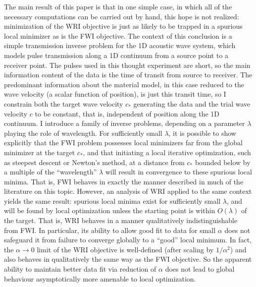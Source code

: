 The main result of this paper is that in one simple case, in which all
of the necessary computations can be carried out by hand, this hope is
not realized: minimization of the WRI objective is just as likely to
be trapped in a spurious local minimizer as is the FWI objective.  The
context of this conclusion is a simple transmission inverse problem
for the 1D acoustic wave system, which models pulse transmission along
a 1D continuum from a source point to a receiver point. The pulses
used in this thought experiment are short, so the main information
content of the data is the time of transit from source to
receiver. The predominant information about the material model, in
this case reduced to the wave velocity (a scalar function of
position), is just this transit time, so I constrain both the target
wave velocity $c_*$ generating the data and the trial wave velocity
$c$ to be constant, that is, independent of position along the 1D
continuum. I introduce a family of inverse problems, depending on a
parameter $\lambda$ playing the role of wavelength. For sufficiently small
$\lambda$, it is possible to show explicitly that the FWI problem
possesses local minimizers far from the global minimizer at the target
$c_*$, and that initiating a local iterative optimization, such as
steepest descent or Newton's method, at a distance from $c_*$ bounded
below by a multiple of the ``wavelength'' $\lambda$ will result in
convergence to these spurious local minima. That is, FWI 
behaves in exactly the manner described in much of the literature on
this topic. However, an analysis of WRI applied to the same context
yields the same result: spurious local minima exist for sufficiently
small $\lambda$, and will be found by local optimization unless the
starting point is within $O(\lambda)$ of the target. That is, WRI
behaves in a manner qualitatively indistinguishable from FWI. In
particular, its ability to allow good fit to data for small $\alpha$
does not safeguard it from failure to converge globally to a ``good''
local minimum. In fact, the $\alpha \rightarrow 0$ limit of the WRI
objective is well-defined (after scaling by $1/\alpha^2$) and also behaves in
qualitatively the same way as the FWI objective. So the apparent
ability to maintain better data fit via reduction of $\alpha$ does not
lead to global behaviour asymptotically more amenable to local optimization.

